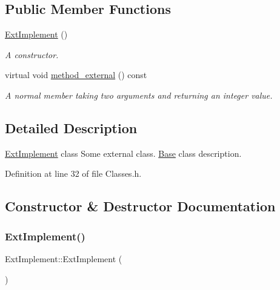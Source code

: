 \subsection*{Public Member Functions}
\begin{DoxyCompactItemize}
\item 
\hyperlink{class_ext_implement_a298c71d0ba5e16fd571dffeaccde6902}{Ext\+Implement} ()
\begin{DoxyCompactList}\small\item\em A constructor. \end{DoxyCompactList}\item 
virtual void \hyperlink{class_ext_implement_a5f41afb83e49e92542b031aecfd097a9}{method\+\_\+external} () const
\begin{DoxyCompactList}\small\item\em A normal member taking two arguments and returning an integer value. \end{DoxyCompactList}\end{DoxyCompactItemize}


\subsection{Detailed Description}
\hyperlink{class_ext_implement}{Ext\+Implement} class Some external class. \hyperlink{class_base}{Base} class description. 

Definition at line 32 of file Classes.\+h.



\subsection{Constructor \& Destructor Documentation}
\mbox{\label{class_ext_implement_a298c71d0ba5e16fd571dffeaccde6902}} 
\subsubsection{\texorpdfstring{Ext\+Implement()}{ExtImplement()}}
{\footnotesize\ttfamily Ext\+Implement\+::\+Ext\+Implement (\begin{DoxyParamCaption}{ }\end{DoxyParamCaption})\hspace{0.3cm}{\ttfamily [inline]}}



